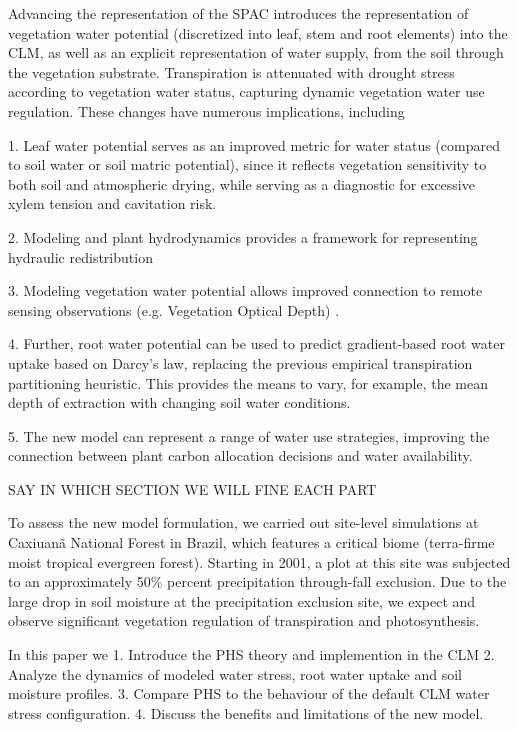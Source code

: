 \documentclass[draft,linenumbers]{agujournal}
\begin{document}
Advancing the representation of the SPAC introduces the representation of vegetation water potential (discretized into leaf, stem and root elements) into the CLM, as well as an explicit representation of water supply, from the soil through the vegetation substrate. Transpiration is attenuated with drought stress according to vegetation water status, capturing dynamic vegetation water use regulation. These changes have numerous implications, including 


1. Leaf water potential serves as an improved metric for water status (compared to soil water or soil matric potential), since it reflects vegetation sensitivity to both soil and atmospheric drying, while serving as a diagnostic for excessive xylem tension and cavitation risk. 

2. Modeling  and plant hydrodynamics provides a framework for representing hydraulic redistribution \citep{lee2005} 

3. Modeling vegetation water potential allows improved connection to remote sensing observations (e.g. Vegetation Optical Depth) \citep{konings2016}. 

4. Further, root water potential can be used to predict gradient-based root water uptake based on Darcy's law, replacing the previous empirical transpiration partitioning heuristic.  This provides the means to vary, for example, the mean depth of extraction with changing soil water conditions.

5. The new model can represent a range of water use strategies, improving the connection between plant carbon allocation decisions and water availability.



SAY IN WHICH SECTION WE WILL FINE EACH PART

To assess the new model formulation, we carried out site-level simulations at Caxiuan\~a National Forest in Brazil, which features a critical biome (terra-firme moist tropical evergreen forest).  Starting in 2001, a plot at this site was subjected to an approximately 50\% percent precipitation through-fall exclusion.  Due to the large drop in soil moisture at the precipitation exclusion site, we expect and observe \citep{fisher2007} significant vegetation regulation of transpiration and photosynthesis.

In this paper we 
1. Introduce the PHS theory and implemention in the CLM
2. Analyze the dynamics of modeled water stress, root water uptake and soil moisture profiles. 
3. Compare PHS to the behaviour of the default  CLM water stress configuration.
4. Discuss the benefits and limitations of the new model. 
\end{document}
